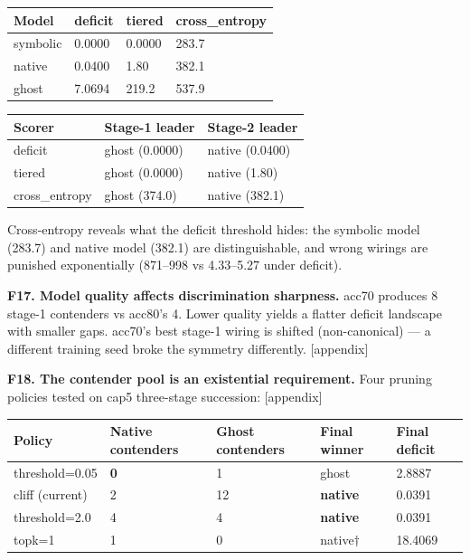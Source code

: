 \documentclass[12pt, a4paper]{article}
\begin{document}
\begin{center}
\begin{tabular}{llll}
\toprule
Model    & deficit & tiered & cross\_entropy \\
\midrule
symbolic & 0.0000  & 0.0000 & 283.7 \\
native   & 0.0400  & 1.80   & 382.1 \\
ghost    & 7.0694  & 219.2  & 537.9 \\
\bottomrule
\end{tabular}
\end{center}

\begin{center}
\begin{tabular}{lll}
\toprule
Scorer        & Stage-1 leader      & Stage-2 leader      \\
\midrule
deficit       & ghost (0.0000)      & native (0.0400)     \\
tiered        & ghost (0.0000)      & native (1.80)       \\
cross\_entropy & ghost (374.0)      & native (382.1)      \\
\bottomrule
\end{tabular}
\end{center}

Cross-entropy reveals what the deficit threshold hides: the symbolic model
(283.7) and native model (382.1) are distinguishable, and wrong wirings are
punished exponentially (871--998 vs 4.33--5.27 under deficit).

\medskip
\noindent\textbf{F17. Model quality affects discrimination sharpness.}
acc70 produces 8 stage-1 contenders vs acc80's 4. Lower quality yields a
flatter deficit landscape with smaller gaps. acc70's best stage-1 wiring is
shifted (non-canonical) --- a different training seed broke the symmetry
differently. [appendix]

\medskip
\noindent\textbf{F18. The contender pool is an existential requirement.}
Four pruning policies tested on cap5 three-stage succession: [appendix]

\begin{center}
\small
\begin{tabular}{lllll}
\toprule
Policy & Native contenders & Ghost contenders & Final winner & Final deficit \\
\midrule
threshold=0.05  & \textbf{0} & 1  & ghost            & 2.8887 \\
cliff (current) & 2          & 12 & \textbf{native}  & 0.0391 \\
threshold=2.0   & 4          & 4  & \textbf{native}  & 0.0391 \\
topk=1          & 1          & 0  & native$\dagger$  & 18.4069 \\
\bottomrule
\end{tabular}
\end{center}
\end{document}
